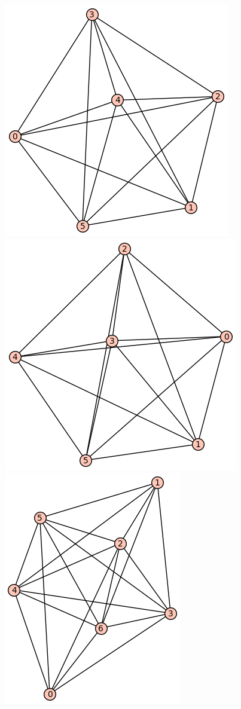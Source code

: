 \documentclass[12pt, letterpaper, twoside]{article}
\begin{document}
\includegraphics[scale=.35]{crit2}
\includegraphics[scale=.35]{crit3}
\includegraphics[scale=.35]{crit4}
\end{document}
